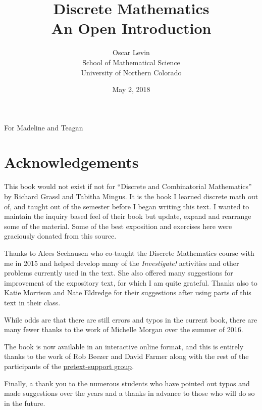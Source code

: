 \documentclass[10pt,]{book}
\title{Discrete Mathematics\\
{\large An Open Introduction}}
\author{Oscar Levin\\
School of Mathematical Science\\
University of Northern Colorado
}
\date{May 2, 2018}
\theoremstyle{plain}
\theoremstyle{definition}
\theoremstyle{definition}
\numberwithin{equation}{chapter}
\begin{document}
\frontmatter


\cleardoublepage
\thispagestyle{empty}
\begin{flushright}\large%
For Madeline and Teagan%
\end{flushright}
\clearpage
\thispagestyle{empty}
\null%
\clearpage
\chapter*{Acknowledgements}\label{acknowledgement-1}
\hypertarget{p-2}{}%
This book would not exist if not for ``Discrete and Combinatorial Mathematics'' by Richard Grassl and Tabitha Mingus. It is the book I learned discrete math out of, and taught out of the semester before I began writing this text. I wanted to maintain the inquiry based feel of their book but update, expand and rearrange some of the material.  Some of the best exposition and exercises here were graciously donated from this source.%
\par
\hypertarget{p-3}{}%
Thanks to Alees Seehausen who co-taught the Discrete Mathematics course with me in 2015 and helped develop many of the \emph{Investigate!} activities and other problems currently used in the text. She also offered many suggestions for improvement of the expository text, for which I am quite grateful. Thanks also to Katie Morrison and Nate Eldredge for their suggestions after using parts of this text in their class.%
\par
\hypertarget{p-4}{}%
While odds are that there are still errors and typos in the current book, there are many fewer thanks to the work of Michelle Morgan over the summer of 2016.%
\par
\hypertarget{p-5}{}%
The book is now available in an interactive online format, and this is entirely thanks to the work of Rob Beezer and David Farmer along with the rest of the participants of the \href{https://groups.google.com/forum/\#!forum/pretext-support}{pretext-support group}.%
\par
\hypertarget{p-6}{}%
Finally, a thank you to the numerous students who have pointed out typos and made suggestions over the years and a thanks in advance to those who will do so in the future.%
\end{document}
